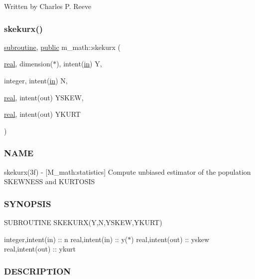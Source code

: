 Written by Charles P. Reeve \mbox{\label{namespacem__math_a7c595127392d65cef1e34cebdb49b27c}} 
\subsubsection{\texorpdfstring{skekurx()}{skekurx()}}
{\footnotesize\ttfamily \hyperlink{M__stopwatch_83_8txt_acfbcff50169d691ff02d4a123ed70482}{subroutine}, \hyperlink{M__stopwatch_83_8txt_a2f74811300c361e53b430611a7d1769f}{public} m\+\_\+math\+::skekurx (\begin{DoxyParamCaption}\item[{\hyperlink{read__watch_83_8txt_abdb62bde002f38ef75f810d3a905a823}{real}, dimension($\ast$), intent(\hyperlink{M__journal_83_8txt_afce72651d1eed785a2132bee863b2f38}{in})}]{Y,  }\item[{integer, intent(\hyperlink{M__journal_83_8txt_afce72651d1eed785a2132bee863b2f38}{in})}]{N,  }\item[{\hyperlink{read__watch_83_8txt_abdb62bde002f38ef75f810d3a905a823}{real}, intent(out)}]{Y\+S\+K\+EW,  }\item[{\hyperlink{read__watch_83_8txt_abdb62bde002f38ef75f810d3a905a823}{real}, intent(out)}]{Y\+K\+U\+RT }\end{DoxyParamCaption})}



\subsubsection*{N\+A\+ME}

skekurx(3f) -\/ \mbox{[}M\+\_\+math\+:statistics\mbox{]} Compute unbiased estimator of the population S\+K\+E\+W\+N\+E\+SS and K\+U\+R\+T\+O\+S\+IS \subsubsection*{S\+Y\+N\+O\+P\+S\+IS}

S\+U\+B\+R\+O\+U\+T\+I\+NE S\+K\+E\+K\+U\+R\+X(\+Y,\+N,\+Y\+S\+K\+E\+W,\+Y\+K\+U\+R\+T)

integer,intent(in) \+:\+: n real,intent(in) \+:\+: y($\ast$) real,intent(out) \+:\+: yskew real,intent(out) \+:\+: ykurt

\subsubsection*{D\+E\+S\+C\+R\+I\+P\+T\+I\+ON}

